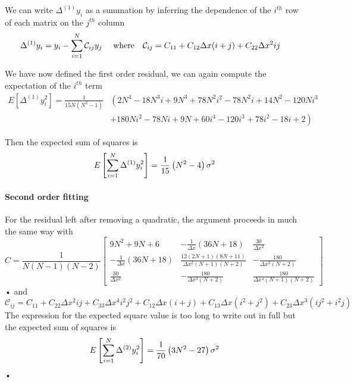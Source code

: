 We can write $\Delta^{(1)} y_{i}$ as a summation by inferring the dependence of the
$i^{th}$ row of each matrix on the $j^{th}$ column
\begin{align}
\Delta^{(1)} y_{i} & = y_{i} - \sum_{i=1}^{N}\mathcal{C}_{ij} y_{j}  
& \textrm{ where} && 
\mathcal{C}_{ij} & = C_{11} + C_{12}\Delta x (i+j) + C_{22}\Delta x^{2} ij
\end{align}

We have now defined the first order residual, we can again compute the expectation
of the $i^{th}$ term
\begin{align}
E\left[\Delta^{(1)} y^{2}_{i}\right]  = 
\frac{1}{15 N \left(N^{2} - 1\right)} & 
\left(2 N^{4} - 18 N^{3} i + 9 N^{3} + 78 N^{2} i^{2} - 
      78 N^{2} i + 14 N^{2} - 120 N i^{3} \right. \\
 & \left. + 180 N i^{2} - 78 N i + 9 N + 60 i^{4} - 120 i^{3} 
          + 78 i^{2} - 18 i + 2\right)
\end{align}

Then the expected sum of squares is 
\begin{equation}
E\left[\sum_{i=1}^{N} \Delta^{(1)} y_{i}^{2}\right] = \frac{1}{15}\left(N^{2} -4\right)\sigma^{2}
\label{eqn: sum of squares k1}
\end{equation}

\paragraph{Second order fitting}
For the residual left after removing a quadratic, the  argument proceeds in much
the same way with 
\begin{equation}
C = \frac{1}{N(N-1)(N-2)}
\left[\begin{matrix}9 N^{2} + 9 N + 6 & - \frac{1}{\Delta{x}} \left(36 N + 18\right) & \frac{30}{\Delta{x}^{2}}\\- \frac{1}{\Delta{x}} \left(36 N + 18\right) & \frac{12 \left(2 N + 1\right) \left(8 N + 11\right)}{\Delta{x}^{2} \left(N + 1\right) \left(N + 2\right)} & - \frac{180}{\Delta{x}^{3} \left(N + 2\right)}\\\frac{30}{\Delta{x}^{2}} & - \frac{180}{\Delta{x}^{3} \left(N + 2\right)} & \frac{180}{\Delta{x}^{4} \left(N + 1\right) \left(N + 2\right)}\end{matrix}\right]
\label{eqn: C_2}
\end{equation}•
and 
\begin{equation}
\mathcal{C}_{ij} = C_{11} + C_{22}\Delta x^{2}ij + C_{33}\Delta x^{4}i^{2}j^{2} + C_{12}\Delta x(i+j) + C_{13}\Delta x (i^{2} + j^2) + C_{23}\Delta x^{3}(ij^{2} + i^{2}j) 
\label{eqn: MCC_2}
\end{equation}
The expression for the expected square value is too long to write out in full
but the expected sum of squares is 
\begin{equation}
E\left[\sum_{i=1}^{N} \Delta^{(2)} y_{i}^{2}\right] = \frac{1}{70}\left(3N^{2} -27\right)\sigma^{2}
\label{eqn: sum of squares k2}
\end{equation}•

